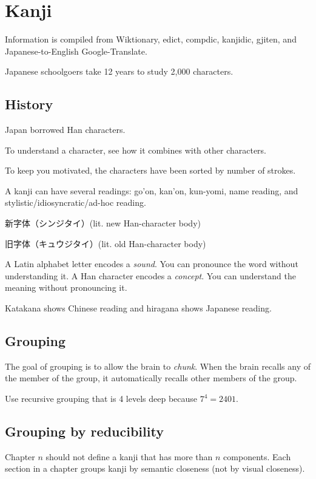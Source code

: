 \chapter{Kanji}

Information is compiled from Wiktionary,
edict, compdic, kanjidic, gjiten,
and Japanese-to-English Google-Translate.

Japanese schoolgoers take 12 years to study 2,000 characters.

\section{History}

Japan borrowed Han characters.

To understand a character, see how it combines with other characters.

To keep you motivated, the characters have been sorted by number of strokes.

A kanji can have several readings:
go'on, kan'on, kun-yomi, name reading, and stylistic/idiosyncratic/ad-hoc reading.

新字体（シンジタイ）(lit. new Han-character body)

旧字体（キュウジタイ）(lit. old Han-character body)

A Latin alphabet letter encodes a \emph{sound}.
You can pronounce the word without understanding it.
A Han character encodes a \emph{concept}.
You can understand the meaning without pronouncing it.

Katakana shows Chinese reading and hiragana shows Japanese reading.

\section{Grouping}

The goal of grouping is to allow the brain to \emph{chunk}.
When the brain recalls any of the member of the group,
it automatically recalls other members of the group.

Use recursive grouping that is 4 levels deep because \(7^4 = 2401\).

\section{Grouping by reducibility}

Chapter \(n\) should not define a kanji
that has more than \(n\) components.
Each section in a chapter groups kanji by semantic closeness
(not by visual closeness).

